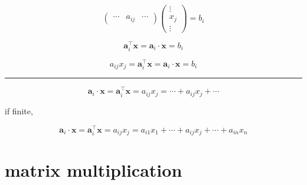 \documentclass[
]{book}
\theoremstyle{definition}
\theoremstyle{definition}
\theoremstyle{definition}
\theoremstyle{definition}
\theoremstyle{remark}
\begin{document}
\[
\begin{pmatrix}\cdots & a_{{\scriptscriptstyle ij}} & \cdots\end{pmatrix}\begin{pmatrix}\vdots\\
x_{{\scriptscriptstyle j}}\\
\vdots
\end{pmatrix}=b_{{\scriptscriptstyle i}}
\]

\[
\boldsymbol{a}_{{\scriptscriptstyle i}}^{\intercal}\boldsymbol{x}=\boldsymbol{a}_{{\scriptscriptstyle i}}\cdot\boldsymbol{x}=b_{i}
\]

\[
a_{{\scriptscriptstyle ij}}x_{{\scriptscriptstyle j}}=\boldsymbol{a}_{{\scriptscriptstyle i}}^{\intercal}\boldsymbol{x}=\boldsymbol{a}_{{\scriptscriptstyle i}}\cdot\boldsymbol{x}=b_{i}
\]

\begin{center}\rule{0.5\linewidth}{0.5pt}\end{center}

\[
\boldsymbol{a}_{{\scriptscriptstyle i}}\cdot\boldsymbol{x}=\boldsymbol{a}_{{\scriptscriptstyle i}}^{\intercal}\boldsymbol{x}=a_{{\scriptscriptstyle ij}}x_{{\scriptscriptstyle j}}=\cdots+a_{{\scriptscriptstyle ij}}x_{{\scriptscriptstyle j}}+\cdots
\]

if finite,

\[
\boldsymbol{a}_{{\scriptscriptstyle i}}\cdot\boldsymbol{x}=\boldsymbol{a}_{{\scriptscriptstyle i}}^{\intercal}\boldsymbol{x}=a_{{\scriptscriptstyle ij}}x_{{\scriptscriptstyle j}}=a_{{\scriptscriptstyle i1}}x_{{\scriptscriptstyle 1}}+\cdots+a_{{\scriptscriptstyle ij}}x_{{\scriptscriptstyle j}}+\cdots+a_{{\scriptscriptstyle in}}x_{{\scriptscriptstyle n}}
\]

\hypertarget{matrix-multiplication}{%
\section{matrix multiplication}\label{matrix-multiplication}}
\end{document}
